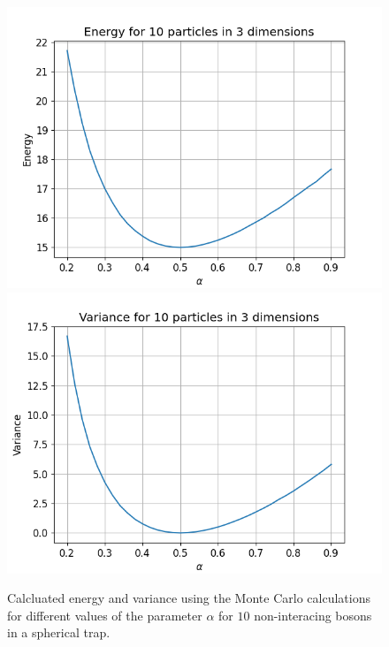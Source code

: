 \documentclass[a4paper, 10pt, english]{revtex4-2} %
\begin{document}
    \begin{figure}[!ht]
        \centering
        \includegraphics[width=\imwidth]{figures/Energy_B_10.png}
        \includegraphics[width=\imwidth]{figures/Varience_B_10.png}
        \caption{Calcluated energy and variance using the Monte Carlo calculations for different values of the parameter $\alpha$ for $10$ non-interacing bosons in a spherical trap.}
        \label{fig: B10}
    \end{figure}
\end{document}
